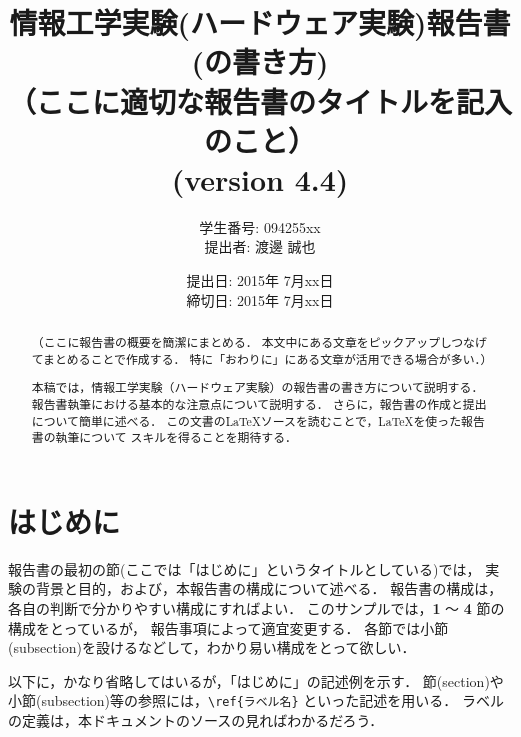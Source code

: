 \documentclass{jarticle}[11pt]
\title{{\normalsize 情報工学実験(ハードウェア実験)報告書(の書き方)}\\
（ここに適切な報告書のタイトルを記入のこと）\\
(version 4.4) }
\author{ 
  学生番号: 094255xx \\
  提出者: 渡邊 誠也
}
\date{
  提出日: 2015年 7月xx日 \\
  締切日: 2015年 7月xx日
}
\begin{document}
\maketitle


\begin{abstract}
（ここに報告書の概要を簡潔にまとめる．
本文中にある文章をピックアップしつなげてまとめることで作成する．
特に「おわりに」にある文章が活用できる場合が多い．）

本稿では，情報工学実験（ハードウェア実験）の報告書の書き方について説明する．
報告書執筆における基本的な注意点について説明する．
さらに，報告書の作成と提出について簡単に述べる．
この文書の\LaTeX ソースを読むことで，\LaTeX を使った報告書の執筆について
スキルを得ることを期待する．
\end{abstract}


\section{はじめに}

報告書の最初の節(ここでは「{\gt はじめに}」というタイトルとしている)では，
実験の背景と目的，および，本報告書の構成について述べる．
報告書の構成は，各自の判断で分かりやすい構成にすればよい．
このサンプルでは，{\bf 1} 〜 {\bf 4} 節の構成をとっているが，
報告事項によって適宜変更する．
各節では小節(subsection)を設けるなどして，わかり易い構成をとって欲しい．

以下に，かなり省略してはいるが，「{\gt はじめに}」の記述例を示す．
節(section)や小節(subsection)等の参照には，\verb|\ref{ラベル名}|
といった記述を用いる．
ラベルの定義は，本ドキュメントのソースの見ればわかるだろう．
\end{document}
